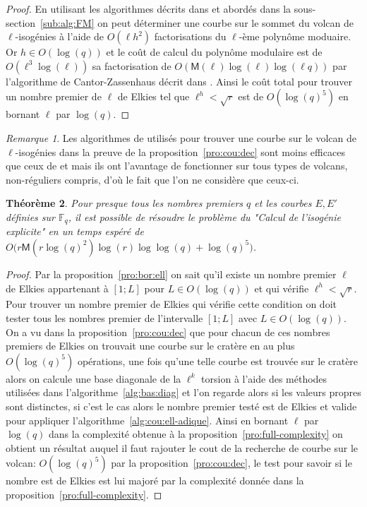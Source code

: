 \documentclass[10pt,a4paper]{book}
\theoremstyle{plain}
\newtheorem{thm}{Théorème}[chapter]
\theoremstyle{definition}
\theoremstyle{definition}
\theoremstyle{definition}
\theoremstyle{definition}
\theoremstyle{remark}
\newtheorem{rem}[thm]{Remarque}
\theoremstyle{remark}
\theoremstyle{definition}
\begin{document}
\begin{proof}
En utilisant les algorithmes décrits dans \cite{FouquetMorain02} et abordés 
dans la sous-section~\ref{sub:alg:FM} on peut déterminer une courbe sur le 
sommet du volcan de $\ell$-isogénies à l'aide de $O(\ell h^2)$ 
  factorisations du $\ell$-ème polynôme moduaire. Or $h \in O(\log(q))$ et
  le coût de calcul du polynôme modulaire est de $O(\ell^3\log(\ell))$ sa factorisation de 
  $O(\mathsf{M}(\ell)\log(\ell)\log(\ell q))$ par l'algorithme de 
  Cantor-Zassenhaus décrit dans \cite[Chapter~14.5]{vzGJG03}. Ainsi le coût 
  total pour trouver un nombre premier de $\ell$ de Elkies tel que $\ell^h<\sqrt{r}$  est de
  $O(\log(q)^5)$ en bornant $\ell$ par $\log(q)$.
	
\end{proof}

\begin{rem}
Les algorithmes de \cite{FouquetMorain02} utilisés pour trouver une courbe sur 
le volcan de $\ell$-isogénies  dans la preuve de la 
proposition~\ref{pro:cou:dec} sont moins efficaces que ceux de 
\cite{Ionica-Joux10} et \cite{MiretMRV05} mais ils ont l'avantage de 
fonctionner sur tous types de volcans, non-réguliers compris, d'où le fait que
l'on ne considère que ceux-ci.
\end{rem}


\begin{thm}
Pour presque tous les nombres premiers $q$ et les courbes $E,E'$ définies sur 
$\mathbb{F}_q$, il est possible de résoudre le problème du "Calcul de l'isogénie explicite" 
en un temps espéré de $O \bigl( r \mathsf{M}(r\log(q)^2) \log(r) \log \log(q)  + \log(q)^5\bigr)$.

\end{thm}

\begin{proof}
Par la proposition~\ref{pro:bor:ell} on sait qu'il existe un nombre premier 
$\ell$ de Elkies appartenant à $[1;L]$ pour $L \in O(\log(q))$ et qui vérifie
$\ell^{h} < \sqrt{r}$. Pour trouver un nombre premier de Elkies qui vérifie 
cette condition on doit tester tous les nombres premier de l'intervalle $[1;L]$
avec $L \in O(\log(q))$. On a vu dans la proposition~\ref{pro:cou:dec} que pour 
chacun de ces nombres premiers de Elkies on trouvait une courbe sur le cratère
en au plus $O(\log(q)^5)$ opérations, une fois qu'une telle courbe est trouvée
sur le cratère alors on calcule une base diagonale de la $\ell^k$ torsion à 
l'aide des méthodes utilisées dans l'algorithme~\ref{alg:bas:diag} et l'on 
regarde alors si les valeurs propres sont distinctes, si c'est le cas alors le
nombre premier testé est de Elkies et valide pour appliquer 
l'algorithme~\ref{alg:cou:ell-adique}.
Ainsi en bornant $\ell$ par $\log(q)$ dans la complexité obtenue à la 
proposition~\ref{pro:full-complexity} on obtient un résultat auquel il faut 
rajouter le cout de la recherche de courbe sur le volcan: $O(\log(q)^5)$ par la 
proposition~\ref{pro:cou:dec}, le test pour savoir si le nombre est de Elkies 
est lui majoré par la complexité donnée dans la 
proposition~\ref{pro:full-complexity}.
\end{proof}
\end{document}
